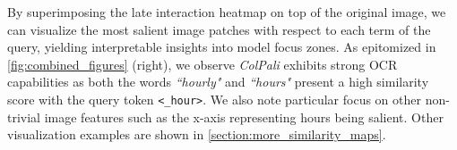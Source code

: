 \documentclass{article} %
\newcommand{\code}[1]{\texttt{#1}}
\begin{document}



By superimposing the late interaction heatmap on top of the original image, we can visualize the most salient image patches with respect to each term of the query, yielding interpretable insights into model focus zones. As epitomized in \autoref{fig:combined_figures} (right), we observe \textit{ColPali} exhibits strong OCR capabilities as both the words \textit{``hourly"} and \textit{``hours"} present a high similarity score with the query token \code{<\_hour>}. We also note particular focus on other non-trivial image features such as the x-axis representing hours being salient. Other visualization examples are shown in \autoref{section:more_similarity_maps}.



\end{document}
